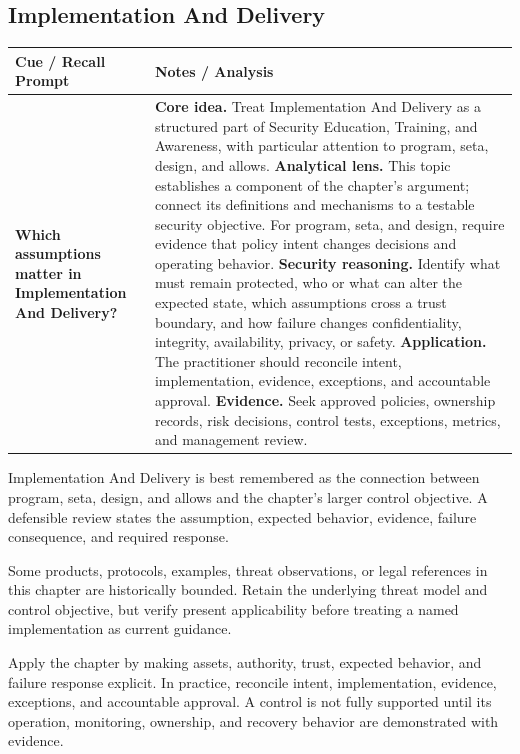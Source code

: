 \documentclass[11pt]{article}
\newcommand{\CornellHeader}{%
\rowcolor{Navy}\color{white}\bfseries Cue / Recall Prompt & \color{white}\bfseries Notes / Analysis\\\hline}
\newcommand{\CornellRow}[2]{%
\cellcolor{CueGray}\RaggedRight\textbf{#1} & \RaggedRight #2\\\hline}
\begin{document}
\subsection*{Implementation And Delivery}
\begin{longtable}{>{\RaggedRight\arraybackslash}p{}|>{\RaggedRight\arraybackslash}p{}}
\CornellHeader
\CornellRow{Which assumptions matter in Implementation And Delivery?}{\textbf{Core idea.} Treat Implementation And Delivery as a structured part of Security Education, Training, and Awareness, with particular attention to program, seta, design, and allows. \textbf{Analytical lens.} This topic establishes a component of the chapter's argument; connect its definitions and mechanisms to a testable security objective. For program, seta, and design, require evidence that policy intent changes decisions and operating behavior. \textbf{Security reasoning.} Identify what must remain protected, who or what can alter the expected state, which assumptions cross a trust boundary, and how failure changes confidentiality, integrity, availability, privacy, or safety. \textbf{Application.} The practitioner should reconcile intent, implementation, evidence, exceptions, and accountable approval. \textbf{Evidence.} Seek approved policies, ownership records, risk decisions, control tests, exceptions, metrics, and management review.}
\end{longtable}
\begin{topicsummary}
Implementation And Delivery is best remembered as the connection between program, seta, design, and allows and the chapter's larger control objective. A defensible review states the assumption, expected behavior, evidence, failure consequence, and required response.
\end{topicsummary}
\begin{historybox}
Some products, protocols, examples, threat observations, or legal references in this chapter are historically bounded. Retain the underlying threat model and control objective, but verify present applicability before treating a named implementation as current guidance.
\end{historybox}
\begin{defensebox}
Apply the chapter by making assets, authority, trust, expected behavior, and failure response explicit. In practice, reconcile intent, implementation, evidence, exceptions, and accountable approval. A control is not fully supported until its operation, monitoring, ownership, and recovery behavior are demonstrated with evidence.
\end{defensebox}
\end{document}
